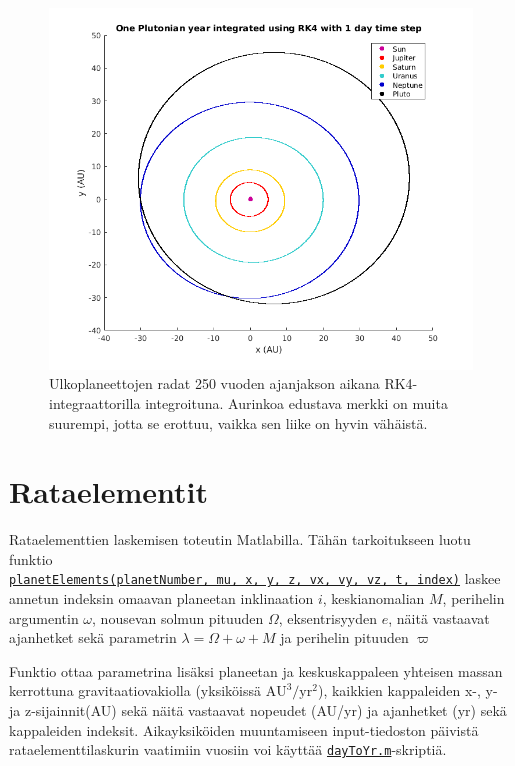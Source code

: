 \documentclass[12pt,a4paper,titlepage]{article}
\begin{document}
\begin{figure}
\centering
\includegraphics[width=\textwidth]{../plots/vuosi-rk4.png}
\caption{Ulkoplaneettojen radat 250 vuoden ajanjakson aikana RK4-integraattorilla integroituna. Aurinkoa edustava merkki on muita suurempi, jotta se erottuu, vaikka sen liike on hyvin vähäistä.}
\label{rk-vuosi}
\end{figure}


\section{Rataelementit}
Rataelementtien laskemisen toteutin Matlabilla. Tähän tarkoitukseen luotu funktio\\\texttt{\href{https://github.com/aajarven/AD-integrators/blob/master/plottaus/planetElements.m}{planetElements(planetNumber, mu, x, y, z, vx, vy, vz, t, index)}} laskee annetun indeksin omaavan planeetan inklinaation $i$, keskianomalian $M$, perihelin argumentin $\omega$, nousevan solmun pituuden $\Omega$, eksentrisyyden $e$, näitä vastaavat ajanhetket sekä parametrin 
$\lambda = \Omega + \omega +M$ ja perihelin pituuden $\varpi$

Funktio ottaa parametrina lisäksi planeetan ja keskuskappaleen yhteisen massan kerrottuna gravitaatiovakiolla (yksiköissä $\mathrm{AU}^3/\mathrm{yr}^2$), kaikkien kappaleiden x-, y- ja z-sijainnit(AU) sekä näitä vastaavat nopeudet (AU/yr) ja ajanhetket (yr) sekä kappaleiden indeksit. Aikayksiköiden muuntamiseen input-tiedoston päivistä rataelementtilaskurin vaatimiin vuosiin voi käyttää \texttt{\href{https://github.com/aajarven/AD-integrators/blob/master/plottaus/dayToYr.m}{dayToYr.m}}-skriptiä.
\end{document}

